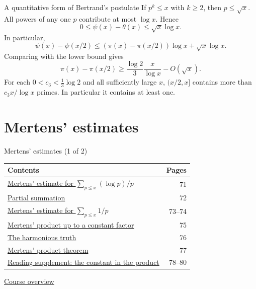 \documentclass[aspectratio=169,11pt]{beamer}
\begin{document}
\begin{frame}{A quantitative form of Bertrand's postulate}
If $p^k\le x$ with $k\ge2$, then $p\le\sqrt x$. All powers of any one $p$ contribute at most $\log x$. Hence
\[0\le\psi(x)-\theta(x)\le\sqrt x\log x.\]
In particular,
\[\psi(x)-\psi(x/2)\le(\pi(x)-\pi(x/2))\log x+\sqrt x\log x.\]
Comparing with the lower bound gives
\[\pi(x)-\pi(x/2)\ge\frac{\log2}{3}\frac{x}{\log x}-O(\sqrt x).\]
For each $0<c_3<\frac13\log2$ and all sufficiently large $x$, $(x/2,x]$ contains more than $c_3x/\log x$ primes. In particular it contains at least one.
\end{frame}


\section{Mertens' estimates}

\begin{frame}{Mertens' estimates (1 of 2)}
\small\renewcommand{\arraystretch}{1.35}
\begin{tabular}{p{}r}\textbf{Contents}&\textbf{Pages}\\\midrule
\hyperlink{Navigation71}{Mertens' estimate for $\sum_{p\le x}(\log p)/p$}&71\\
\hyperlink{Navigation72}{Partial summation}&72\\
\hyperlink{Navigation73}{Mertens' estimate for $\sum_{p\le x}1/p$}&73--74\\
\hyperlink{Navigation75}{Mertens' product up to a constant factor}&75\\
\hyperlink{Navigation76}{The harmonious truth}&76\\
\hyperlink{Navigation77}{Mertens' product theorem}&77\\
\hyperlink{Navigation78}{Reading supplement: the constant in the product}&78--80\\
\end{tabular}\par\medskip\hyperlink{overview}{\color{teal}Course overview}\end{frame}
\end{document}
